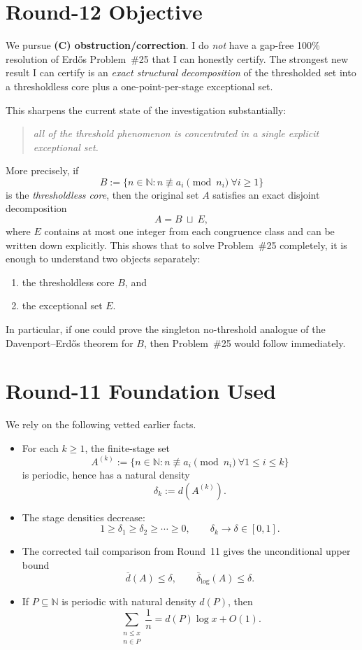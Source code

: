 \section{Round-12 Objective}
We pursue \textbf{(C) obstruction/correction}.  I do \emph{not} have a gap-free 100\% resolution of Erd\H{o}s Problem~\#25 that I can honestly certify.  The strongest new result I can certify is an \emph{exact structural decomposition} of the thresholded set into a thresholdless core plus a one-point-per-stage exceptional set.

This sharpens the current state of the investigation substantially:
\begin{quote}
\emph{all of the threshold phenomenon is concentrated in a single explicit exceptional set.}
\end{quote}
More precisely, if
\[
B:=\{n\in\mathbb N: n\not\equiv a_i\pmod{n_i}\ \forall i\ge 1\}
\]
is the \emph{thresholdless core}, then the original set $A$ satisfies an exact disjoint decomposition
\[
A = B\ \sqcup\ E,
\]
where $E$ contains at most one integer from each congruence class and can be written down explicitly.  This shows that to solve Problem~\#25 completely, it is enough to understand two objects separately:
\begin{enumerate}
\item the thresholdless core $B$, and
\item the exceptional set $E$.
\end{enumerate}
In particular, if one could prove the singleton no-threshold analogue of the Davenport--Erd\H{o}s theorem for $B$, then Problem~\#25 would follow immediately.

\section{Round-11 Foundation Used}
We rely on the following vetted earlier facts.
\begin{itemize}
\item For each $k\ge 1$, the finite-stage set
\[
A^{(k)}:=\{n\in\mathbb N: n\not\equiv a_i\pmod{n_i}\ \forall 1\le i\le k\}
\]
is periodic, hence has a natural density
\[
\delta_k:=d(A^{(k)}).
\]
\item The stage densities decrease:
\[
1\ge \delta_1\ge \delta_2\ge \cdots \ge 0,
\qquad
\delta_k\to \delta\in[0,1].
\]
\item The corrected tail comparison from Round~11 gives the unconditional upper bound
\begin{equation}
\overline d(A)\le \delta,
\qquad
\overline\delta_{\log}(A)\le \delta.
\tag{12.1}
\end{equation}
\item If $P\subseteq\mathbb N$ is periodic with natural density $d(P)$, then
\[
\sum_{\substack{n\le x\\ n\in P}}\frac1n = d(P)\log x + O(1).
\]
\end{itemize}

